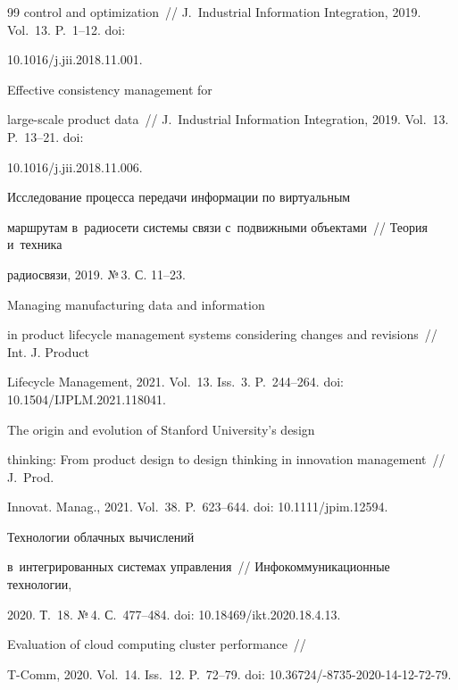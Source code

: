 {{\begin{thebibliography}{99}
control and optimization~/\!\!/ J.~Industrial Information Integration, 2019. Vol.~13. P.~1--12. doi: 

10.1016\!/\!j.jii.2018.11.001.


 Effective consistency management for  

large-scale product data~/\!\!/ J.~Industrial Information Integration, 2019. Vol.~13. P.~13--21. doi: 

10.1016\!/\!j.jii.2018.11.006.


 Исследование процесса передачи информации по виртуальным 

марш\-ру\-там в~радиосети сис\-те\-мы связи с~подвижными объектами~/\!\!/ Теория и~техника 

радиосвязи, 2019. №\,3. С. 11--23.


 Managing manufacturing data and information 

in product lifecycle management systems considering changes and revisions~/\!\!/ Int. J. Product 

Lifecycle Management, 2021. Vol.~13. Iss.~3. P.~244--264. doi: 10.1504\!/\!IJPLM.2021.118041.




 The origin and evolution of Stanford University's design 

thinking: From product design to design thinking in innovation management~/\!\!/ J.~Prod. 

Innovat. Manag., 2021. Vol.~38. P.~623--644. doi: 10.1111\!/\!jpim.12594.


 Технологии облачных вы\-чис\-ле\-ний 

в~интегрированных сис\-те\-мах управ\-ле\-ния~/\!\!/ Инфокоммуникационные технологии, 

2020. Т.~18. №\,4. С.~477--484. doi: 10.18469\!/\!ikt.2020.18.4.13.


 Evaluation of cloud computing cluster performance~/\!\!/  

T-Comm, 2020. Vol.~14. Iss.~12. P.~72--79. doi: 10.36724\!/-8735-2020-14-12-72-79.


\end{thebibliography}}}
